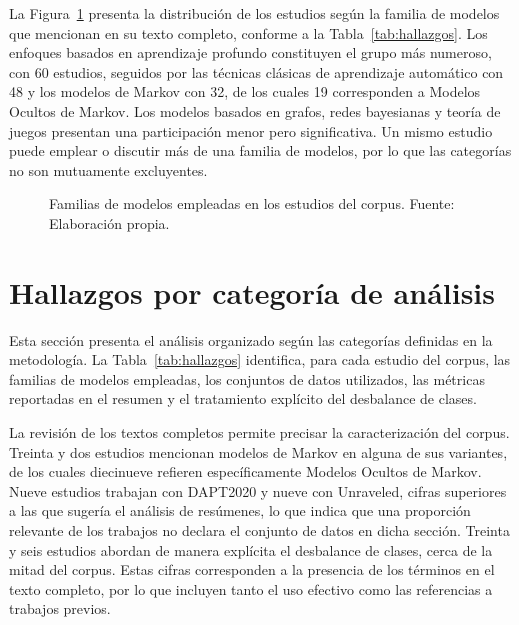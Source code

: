 La Figura~\ref{fig:modelos} presenta la distribución de los estudios según la familia de modelos que mencionan en su texto completo, conforme a la Tabla~\ref{tab:hallazgos}. Los enfoques basados en aprendizaje profundo constituyen el grupo más numeroso, con 60 estudios, seguidos por las técnicas clásicas de aprendizaje automático con 48 y los modelos de Markov con 32, de los cuales 19 corresponden a Modelos Ocultos de Markov. Los modelos basados en grafos, redes bayesianas y teoría de juegos presentan una participación menor pero significativa. Un mismo estudio puede emplear o discutir más de una familia de modelos, por lo que las categorías no son mutuamente excluyentes.

\begin{figure}[h!]
\centering
{}
\caption{Familias de modelos empleadas en los estudios del corpus. Fuente: Elaboración propia.}
\label{fig:modelos}
\end{figure}

\section{Hallazgos por categoría de análisis}

Esta sección presenta el análisis organizado según las categorías definidas en la metodología. La Tabla~\ref{tab:hallazgos} identifica, para cada estudio del corpus, las familias de modelos empleadas, los conjuntos de datos utilizados, las métricas reportadas en el resumen y el tratamiento explícito del desbalance de clases.

La revisión de los textos completos permite precisar la caracterización del corpus. Treinta y dos estudios mencionan modelos de Markov en alguna de sus variantes, de los cuales diecinueve refieren específicamente Modelos Ocultos de Markov. Nueve estudios trabajan con DAPT2020 y nueve con Unraveled, cifras superiores a las que sugería el análisis de resúmenes, lo que indica que una proporción relevante de los trabajos no declara el conjunto de datos en dicha sección. Treinta y seis estudios abordan de manera explícita el desbalance de clases, cerca de la mitad del corpus. Estas cifras corresponden a la presencia de los términos en el texto completo, por lo que incluyen tanto el uso efectivo como las referencias a trabajos previos.

